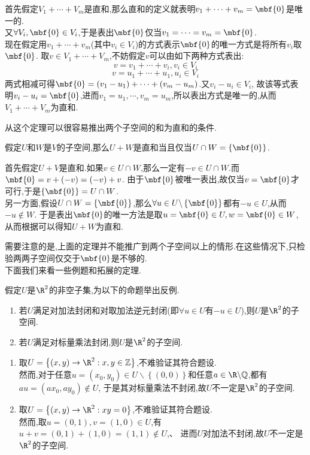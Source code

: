 \documentclass{ctexart}
\begin{document}
\begin{solution}[2.2.1 Proof.]
    首先假定$V_1+\cdots+V_m$是直和,那么直和的定义就表明$v_1+\cdots+v_m=\mbf{0}$是唯一的.\\
    又$\forall V_i,\mbf{0}\in V_i$,于是表出$\mbf{0}$仅当$v_1=\cdots=v_m=\mbf{0}$.\\
    现在假定用$v_1+\cdots+v_m$(其中$v_i\in V_i$)的方式表示$\mbf{0}$的唯一方式是将所有$v_i$取$\mbf{0}$.
    取$v\in V_1+\cdots+V_m$,不妨假定$v$可以由如下两种方式表出:
    $$v=v_1+\cdots+v_i,v_i\in V_i$$
    $$v=u_1+\cdots+u_1,u_i\in V_i$$
    两式相减可得$\mbf{0}=(v_1-u_1)+\cdots+(v_m-u_m)$.又$v_i-u_i\in V_i$,
    故该等式表明$v_i-u_i=\mbf{0}$,进而$v_1=u_1,\cdots,v_m=u_m$,所以表出方式是唯一的,从而$V_1+\cdots+V_m$为直和.
\end{solution}\noindent
从这个定理可以很容易推出两个子空间的和为直和的条件.
\begin{formal}[2.2.2 两个子空间的直和]
    假定$U$和$W$是$V$的子空间,那么$U+W$是直和当且仅当$U\cap W=\left\{\mbf{0}\right\}$.
\end{formal}
\begin{solution}[2.2.2 Proof.]
    首先假定$U+V$是直和.如果$v\in U\cap W$,那么一定有$-v\in U\cap W$.而$\mbf{0}=v+(-v)=(-v)+v$.
    由于$\mbf{0}$被唯一表出,故仅当$v=\mbf{0}$才可行,于是$\left\{\mbf{0}\right\}=U\cap W$.\\
    另一方面,假设$U\cap W=\left\{\mbf{0}\right\}$,那么$\forall u\in U\backslash\left\{\mbf{0}\right\}$都有$-u\in U$,从而$-u\notin W$.
    于是表出$\mbf{0}$的唯一方法是取$u=\mbf{0}\in U,w=\mbf{0}\in W$,从而根据可以得知$U+W$为直和.
\end{solution}\noindent
需要注意的是,上面的定理并不能推广到两个子空间以上的情形.在这些情况下,只检验两两子空间仅交于$\mbf{0}$是不够的.
\ \\
下面我们来看一些例题和拓展的定理.
\begin{problem}[Example 1.]
    假定$U$是$\R^2$的非空子集,为以下的命题举出反例.
    \begin{enumerate}[label=\textbf{(\alph*)}]
        \item 若$U$满足对加法封闭和对取加法逆元封闭(即$\forall u\in U$有$-u\in U$),则$U$是$\R^2$的子空间.
        \item 若$U$满足对标量乘法封闭,则$U$是$\R^2$的子空间.
    \end{enumerate}
\end{problem}
\begin{solution}[Solution.]
    \begin{enumerate}[label=\textbf{(\alph*)}]
        \item 取$U=\left\{(x,y)\to\R^2:x,y\in\mathbb{Z}\right\}$,不难验证其符合题设.\\
            然而,对于任意$u=(x_0,y_0)\in U\backslash\left\{(0,0)\right\}$和任意$a\in\R\backslash\mathbb{Q}$,都有$au=(ax_0,ay_0)\notin U$,
            于是其对标量乘法不封闭,故$U$不一定是$\R^2$的子空间.
        \item 取$U=\left\{(x,y)\to\R^2:xy=0\right\}$,不难验证其符合题设.\\
            然而,取$u=(0,1),v=(1,0)\in U$,有$u+v=(0,1)+(1,0)=(1,1)\notin U$,、
            进而$U$对加法不封闭,故$U$不一定是$\R^2$的子空间.
    \end{enumerate}
\end{solution}\noindent
\end{document}
